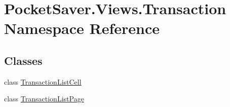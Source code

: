 \hypertarget{namespace_pocket_saver_1_1_views_1_1_transaction}{}\section{Pocket\+Saver.\+Views.\+Transaction Namespace Reference}
\label{namespace_pocket_saver_1_1_views_1_1_transaction}
\subsection*{Classes}
\begin{DoxyCompactItemize}
\item 
class \hyperlink{class_pocket_saver_1_1_views_1_1_transaction_1_1_transaction_list_cell}{Transaction\+List\+Cell}
\item 
class \hyperlink{class_pocket_saver_1_1_views_1_1_transaction_1_1_transaction_list_page}{Transaction\+List\+Page}
\end{DoxyCompactItemize}
